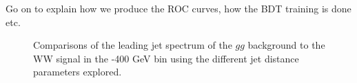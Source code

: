 Go on to explain how we produce the ROC curves, how the BDT training
is done etc.

\begin{figure}
\begin{center}
\caption{Comparisons of the leading jet \pt spectrum of the $gg$
  background to the WW signal in the -400 GeV bin using the
  different \antikt jet distance parameters explored.}
\label{fig:pt300_basics}
\end{center}
\end{figure}

